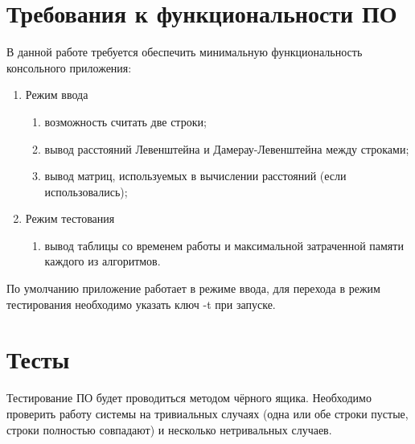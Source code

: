     \section{Требования к функциональности ПО}
        В данной работе требуется обеспечить минимальную функциональность консольного приложения:
        \begin{enumerate}
            \item Режим ввода
            \begin{enumerate}
                \item возможность считать две строки;
                \item вывод расстояний Левенштейна и Дамерау-Левенштейна между строками;
                \item вывод матриц, используемых в вычислении расстояний (если использовались);
            \end{enumerate}
            \item Режим тестования 
            \begin{enumerate}
                \item вывод таблицы со временем\cite{CPU-time} работы и максимальной затраченной памяти каждого из алгоритмов.
            \end{enumerate}
        \end{enumerate}
        
        По умолчанию приложение работает в режиме ввода, для перехода в режим тестирования необходимо указать
        ключ -t при запуске. 

    \section{Тесты}
    Тестирование ПО будет проводиться методом чёрного ящика. Необходимо проверить работу системы 
    на тривиальных случаях (одна или обе строки пустые, строки полностью совпадают) 
    и несколько нетривальных случаев.

\newpage